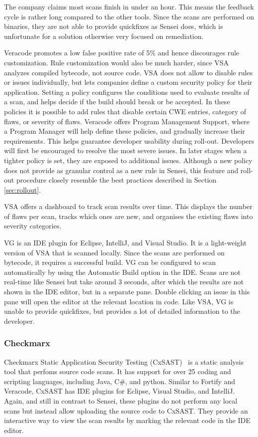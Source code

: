 The company claims most scans finish in under an hour. This means the feedback cycle is rather long compared to the other tools. Since the scans are performed on binaries, they are not able to provide quickfixes as Sensei does, which is unfortunate for a solution otherwise very focused on remediation.

Veracode promotes a low false positive rate of 5\% and hence discourages rule customization. Rule customization would also be much harder, since VSA analyzes compiled bytecode, not source code. VSA does not allow to disable rules or issues individually, but lets companies define a custom security policy for their application. Setting a policy configures the conditions used to evaluate results of  a scan, and helps decide if the build should break or be accepted. In these policies it is possible to add rules that disable certain CWE entries, category of flaws, or severity of flaws. Veracode offers Program Management Support, where a Program Manager will help define these policies, and gradually increase their requirements. This helps guarantee developer usability during roll-out. Developers will first be encouraged to resolve the most severe issues. In later stages when a tighter policy is set, they are exposed to additional issues. Although a new policy does not provide as granular control as a new rule in Sensei, this feature and roll-out procedure closely resemble the best practices described in Section \ref{sec:rollout}.

VSA offers a dashboard to track scan results over time. This displays the number of flaws per scan, tracks which ones are new, and organises the existing flaws into severity categories.

VG is an IDE plugin for Eclipse, IntelliJ, and Visual Studio. It is a light-weight version of VSA that is scanned locally. Since the scans are performed on bytecode, it requires a successful build. VG can be configured to scan automatically by using the Automatic Build option in the IDE. Scans are not real-time like Sensei but take around 3 seconds, after which the results are not shown in the IDE editor, but in a separate pane. Double clicking an issue in this pane will open the editor at the relevant location in code. Like VSA, VG is unable to provide quickfixes, but provides a lot of detailed information to the developer.

\subsubsection{Checkmarx}
Checkmarx Static Application Security Testing (CxSAST)~\cite{cxsast} is a static analysis tool that perfoms source code scans. It has support for over 25 coding and scripting languages, including Java, C\#, and python. Similar to Fortify and Veracode, CxSAST has IDE plugins for Eclipse, Visual Studio, and IntelliJ. Again, and still in contrast to Sensei, these plugins do not perform any local scans but instead allow uploading the source code to CxSAST. They provide an interactive way to view the scan results by marking the relevant code in the IDE editor. 


